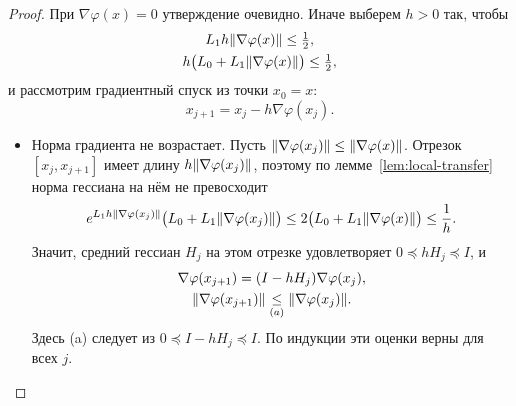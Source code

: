 \begin{proof}
При $\nabla\varphi(x)=0$ утверждение очевидно. Иначе выберем $h>0$ так, чтобы
\[
 \begin{gathered}
 L_1h\lVert\nabla\varphi(x)\rVert\le\tfrac12,\\
 h\bigl(L_0+L_1\lVert\nabla\varphi(x)\rVert\bigr)\le\tfrac12,
 \end{gathered}
\]
и рассмотрим градиентный спуск из точки $x_0=x$:
\[
 x_{j+1}=x_j-h\nabla\varphi(x_j).
\]

\begin{itemize}
\item Норма градиента не возрастает. Пусть
$\lVert\nabla\varphi(x_j)\rVert\le\lVert\nabla\varphi(x)\rVert$. Отрезок
$[x_j,x_{j+1}]$ имеет длину $h\lVert\nabla\varphi(x_j)\rVert$, поэтому
по лемме~\ref{lem:local-transfer} норма гессиана на нём не превосходит
\begin{equation}\label{eq:self-bound-step-curvature}
 e^{L_1h\lVert\nabla\varphi(x_j)\rVert}
 \bigl(L_0+L_1\lVert\nabla\varphi(x_j)\rVert\bigr)
 \le2\bigl(L_0+L_1\lVert\nabla\varphi(x)\rVert\bigr)
 \le\frac1h.
\end{equation}
Значит, средний гессиан $H_j$ на этом отрезке удовлетворяет
$0\preceq hH_j\preceq I$, и
\[
 \begin{gathered}
 \nabla\varphi(x_{j+1})=(I-hH_j)\nabla\varphi(x_j),\\
 \lVert\nabla\varphi(x_{j+1})\rVert\mathrel{\underset{(a)}{\le}}\lVert\nabla\varphi(x_j)\rVert.
 \end{gathered}
\]
Здесь (a) следует из $0\preceq I-hH_j\preceq I$.
По индукции эти оценки верны для всех $j$.


\end{itemize}
\end{proof}
